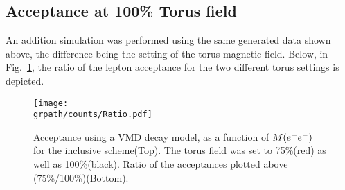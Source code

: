 \FloatBarrier
\subsection{Acceptance at 100\% Torus field}
An addition simulation was performed using the same generated data shown above, the difference being the setting of the torus magnetic field. Below, in Fig.~\ref{fig:ratio}, the ratio of the lepton acceptance for the two different torus settings is depicted.
\begin{figure}[h!]\begin{center}
 		\texttt{[image: \\grpath/counts/Ratio.pdf]}
 		\caption[Acceptance, as a function of $M(\epem)$]{\label{fig:ratio}{Acceptance using a VMD decay model, as a function of $M(\epem)$ for the inclusive scheme(Top). The torus field was set to 75\%(red) as well as 100\%(black). Ratio of the acceptances plotted above (75\%/100\%)(Bottom). }}
\end{center}\end{figure}
